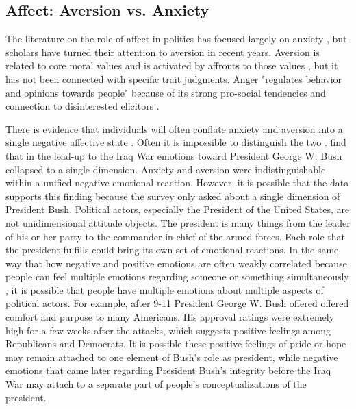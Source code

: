 \subsection{Affect: Aversion vs. Anxiety}

The literature on the role of affect in politics has focused largely on anxiety \cite{Marcusetal2000}, but scholars have turned their attention to aversion in recent years. Aversion is related to core moral values and is activated by affronts to those values \cite{SteenbergenEllis2006}, but it has not been connected with specific trait judgments. Anger "regulates behavior and opinions towards people" \cite[358]{Petersen2010} because of its strong pro-social tendencies and connection to disinterested elicitors \cite[854]{Haidt2003}.

There is evidence that individuals will often conflate anxiety and aversion into a single negative affective state \cite{HuddyFeldmanCassese2007,Petersen2010}. Often it is impossible to distinguish the two \cite{Marcusetal2006}.   find that in the lead-up to the Iraq War emotions toward President George W. Bush collapsed to a single dimension. Anxiety and aversion were indistinguishable within a unified negative emotional reaction. However, it is possible that the data supports this finding because the survey only asked about a single dimension of President Bush. Political actors, especially the President of the United States, are not unidimensional attitude objects. The president is many things from the leader of his or her party to the commander-in-chief of the armed forces. Each role that the president fulfills could bring its own set of emotional reactions. In the same way that how negative and positive emotions are often weakly correlated because people can feel multiple emotions regarding someone or something simultaneously \cite{Watsonetal1999}, it is possible that people have multiple emotions about multiple aspects of political actors. For example, after 9-11 President George W. Bush offered offered comfort and purpose to many Americans. His approval ratings were extremely high for a few weeks after the attacks, which suggests positive feelings among Republicans and Democrats. It is possible these positive feelings of pride or hope may remain attached to one element of Bush's role as president, while negative emotions that came later regarding President Bush's integrity before the Iraq War may attach to a separate part of people's conceptualizations of the president.

